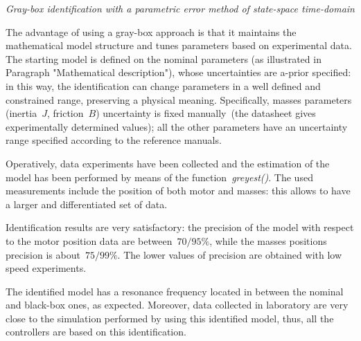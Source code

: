 \textit{Gray-box identification with a parametric error method of state-space time-domain} \\
\par The advantage of using a gray-box approach is that it maintains the mathematical model structure and tunes parameters based on experimental data. The starting model is defined on the nominal parameters (as illustrated in Paragraph "Mathematical description"), whose uncertainties are a-prior specified: in this way, the identification can change parameters in a well defined and constrained range, preserving a physical meaning. Specifically, masses parameters (inertia~$J$, friction~$B$) uncertainty is fixed manually~(the datasheet gives experimentally determined values); all the other parameters have an uncertainty range specified according to the reference manuals.

Operatively, data experiments have been collected and the estimation of the model has been performed by means of the function~\textit{greyest()}. The used measurements include the position of both motor and masses: this allows to have a larger and differentiated set of data.

Identification results are very satisfactory: the precision of the model with respect to the motor position data are between~$70 / 95\%$, while the masses positions precision is about~$75 / 99\%$. The lower values of precision are obtained with low speed experiments.

The identified model has a resonance frequency located in between the nominal and black-box ones, as expected. Moreover, data collected in laboratory are very close to the simulation performed by using this identified model, thus, all the controllers are based on this identification.
